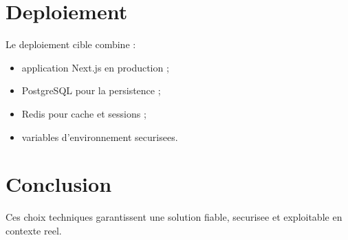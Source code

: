 \section{Deploiement}
Le deploiement cible combine :
\begin{itemize}
  \item application Next.js en production ;
  \item PostgreSQL pour la persistence ;
  \item Redis pour cache et sessions ;
  \item variables d'environnement securisees.
\end{itemize}

\section{Conclusion}
Ces choix techniques garantissent une solution fiable, securisee et exploitable en contexte reel.
